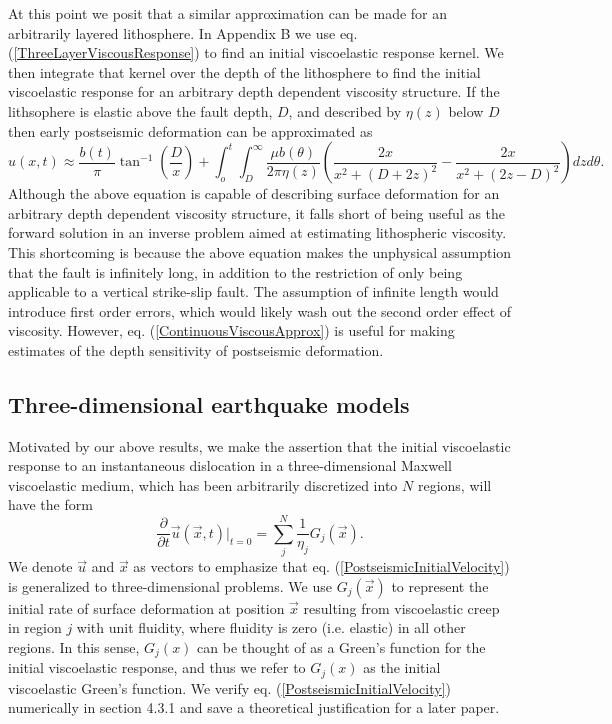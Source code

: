 \documentclass[extra,mreferee]{gji}
\begin{document}
At this point we posit that a similar approximation can be made for an
arbitrarily layered lithosphere. In Appendix B we use
eq. (\ref{ThreeLayerViscousResponse}) to find an initial viscoelastic
response kernel.  We then integrate that kernel over the depth of the
lithosphere to find the initial viscoelastic response for an arbitrary
depth dependent viscosity structure.  If the lithsophere is elastic
above the fault depth, $D$, and described by $\eta(z)$ below $D$ then
early postseismic deformation can be approximated as
\begin{equation}\label{ContinuousViscousApprox}
u(x,t) \approx \frac{b(t)}{\pi}\tan^{-1}(\frac{D}{x}) + 
               \int_o^t\int_D^\infty \frac{\mu b(\theta)}{2\pi\eta(z)}
                                    \left(\frac{2x}{x^2 + \left(D + 2z\right)^2} - 
                                    \frac{2x}{x^2 + \left(2z - D\right)^2}\right)
                                    dz d\theta.
\end{equation}
Although the above equation is capable of describing surface
deformation for an arbitrary depth dependent viscosity structure, it
falls short of being useful as the forward solution in an inverse
problem aimed at estimating lithospheric viscosity.  This shortcoming
is because the above equation makes the unphysical assumption that the
fault is infinitely long, in addition to the restriction of only being
applicable to a vertical strike-slip fault.  The assumption of
infinite length would introduce first order errors, which would likely
wash out the second order effect of viscosity. However,
eq. (\ref{ContinuousViscousApprox}) is useful for making estimates of
the depth sensitivity of postseismic deformation.

\subsection{Three-dimensional earthquake models}
Motivated by our above results, we make the assertion that the initial
viscoelastic response to an instantaneous dislocation in a
three-dimensional Maxwell viscoelastic medium, which has been
arbitrarily discretized into $N$ regions, will have the form
\begin{equation}\label{PostseismicInitialVelocity}
  \frac{\partial}{\partial t}\vec{u}(\vec{x},t)\big|_{t=0} = \sum_j^N\frac{1}{\eta_j}G_j(\vec{x}).
\end{equation}
We denote $\vec{u}$ and $\vec{x}$ as vectors to emphasize that
eq. (\ref{PostseismicInitialVelocity}) is generalized to
three-dimensional problems.  We use $G_j(\vec{x})$ to represent the
initial rate of surface deformation at position $\vec{x}$ resulting
from viscoelastic creep in region $j$ with unit fluidity, where
fluidity is zero (i.e. elastic) in all other regions.  In this sense,
$G_j(x)$ can be thought of as a Green's function for the initial
viscoelastic response, and thus we refer to $G_j(x)$ as the initial
viscoelastic Green's function.  We verify
eq. (\ref{PostseismicInitialVelocity}) numerically in section 4.3.1 and
save a theoretical justification for a later paper.
\end{document}

